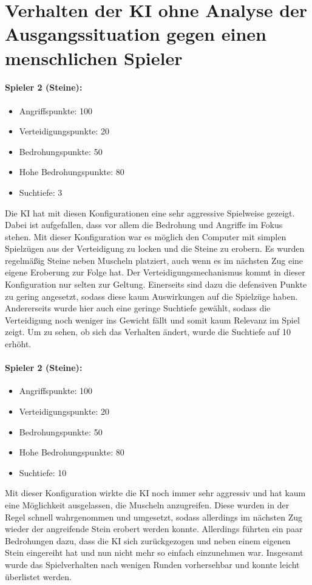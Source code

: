 \section{Verhalten der KI ohne Analyse der Ausgangssituation gegen einen menschlichen Spieler}
\label{ch:Evaluierung:sec:KIvsHuman}
\paragraph{Spieler 2 (Steine):}
\begin{itemize}
	\item Angriffspunkte: 100
	\item Verteidigungspunkte: 20
	\item Bedrohungspunkte: 50
	\item Hohe Bedrohungspunkte: 80
	\item Suchtiefe: 3
\end{itemize}
Die KI hat mit diesen Konfigurationen eine sehr aggressive Spielweise gezeigt. Dabei ist aufgefallen, dass vor allem die Bedrohung und Angriffe im Fokus stehen. Mit dieser Konfiguration war es möglich den Computer mit simplen Spielzügen aus der Verteidigung zu locken und die Steine zu erobern. Es wurden regelmäßig Steine neben Muscheln platziert, auch wenn es im nächsten Zug eine eigene Eroberung zur Folge hat. Der Verteidigungsmechanismus kommt in dieser Konfiguration nur selten zur Geltung. Einerseits sind dazu die defensiven Punkte zu gering angesetzt, sodass diese kaum Auswirkungen auf die Spielzüge haben. Andererseits wurde hier auch eine geringe Suchtiefe gewählt, sodass die Verteidigung noch weniger ins Gewicht fällt und somit kaum Relevanz im Spiel zeigt. Um zu sehen, ob sich das Verhalten ändert, wurde die Suchtiefe auf 10 erhöht.

\paragraph{Spieler 2 (Steine):}
\begin{itemize}
	\item Angriffspunkte: 100
	\item Verteidigungspunkte: 20
	\item Bedrohungspunkte: 50
	\item Hohe Bedrohungspunkte: 80
	\item Suchtiefe: 10
\end{itemize}

Mit dieser Konfiguration wirkte die KI noch immer sehr aggressiv und hat kaum eine Möglichkeit ausgelassen, die Muscheln anzugreifen. Diese wurden in der Regel schnell wahrgenommen und umgesetzt, sodass allerdings im nächsten Zug wieder der angreifende Stein erobert werden konnte. Allerdings führten ein paar Bedrohungen dazu, dass die KI sich zurückgezogen und neben einem eigenen Stein eingereiht hat und nun nicht mehr so einfach einzunehmen war. Insgesamt wurde das Spielverhalten nach wenigen Runden vorhersehbar und konnte leicht überlistet werden.


